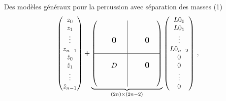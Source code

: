 \begin{frame}{Des modèles généraux pour la percussion avec séparation des masses (1)}
\begin{align}
      \begin{pmatrix}
        z_0 \\ z_1 \\ \vdots \\ z_{n-1} \\ \dot z_0 \\ \dot z_1 \\ \vdots \\ \dot z_{n-1}
        \end{pmatrix}
    +
    \underbrace{\begin{pmatrix}
        \begin{matrix}
       & & &  \\ & & &  \\ & & \bigzero & \\ & & & \\      
        \end{matrix}
        & \rvline 
        &     \begin{matrix}
            & & &  \\ & & &  \\ & & \bigzero & \\ & & & \\      
             \end{matrix}  \\ 
        \hline
        \begin{matrix}
            & & &  \\ & & D & \\ & & & \\ & & & \\     
        \end{matrix}
        & \rvline 
        &   \begin{matrix}
            & & &  \\ & & \bigzero &  \\ & &  & \\ & & & \\      
            \end{matrix}
      \end{pmatrix}}_{(2n) \times (2n-2)}
      \begin{pmatrix}
        L0_0 \\ L0_1 \\ \vdots \\ L0_{n-2} \\ 0 \\ 0 \\ \vdots \\ 0
        \end{pmatrix} \,,
	\end{align}
	

\end{frame}
